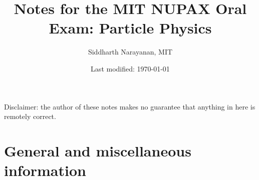 

\pagestyle{fancy}
\chead{\today}
\setcounter{section}{-1}


\title{Notes for the MIT NUPAX Oral Exam: Particle Physics}
\date{Last modified: \today}
\author{Siddharth Narayanan, MIT}

\maketitle

\vspace{20mm}
\begin{center}
Disclaimer: the author of these notes makes no guarantee that anything in here is remotely correct. 
\end{center}
\clearpage
\tableofcontents
\clearpage

\section{General and miscellaneous information}
